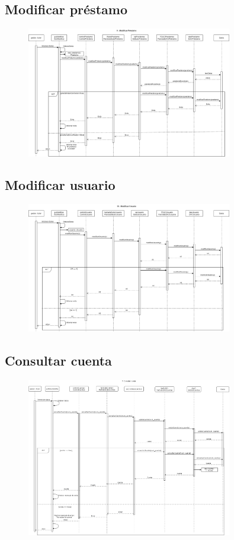 \documentclass[12pt]{article}
\begin{document}
\subsection{Modificar préstamo}
\begin{figure}[H]
    \centering
    \includegraphics[width=0.8\textwidth]{images/9-GestorModificaPrestamoFinal.png}
\end{figure}
\subsection{Modificar usuario}
\begin{figure}[H]
    \centering
    \includegraphics[width=0.8\textwidth]{images/10._ModificarUsuario.png}
\end{figure}
\subsection{Consultar cuenta}
\begin{figure}[H]
    \centering
    \includegraphics[width=0.8\textwidth]{images/ConsultaCuenta.png}
\end{figure}
\end{document}

